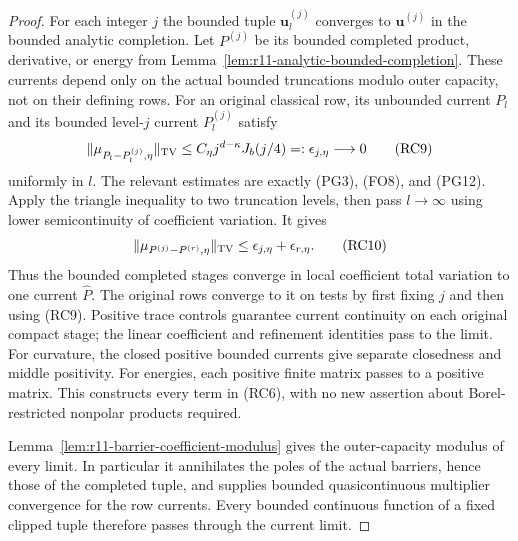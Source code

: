 \documentclass[11pt,a4paper]{article}
\numberwithin{equation}{section}
\theoremstyle{definition}
\theoremstyle{remark}
\begin{document}
\begin{proof}
For each integer $j$ the bounded tuple
$\mathbf u_l^{(j)}$ converges to $\mathbf u^{(j)}$ in the
bounded analytic completion. Let $P^{(j)}$ be its bounded
completed product, derivative, or energy from
Lemma~\ref{lem:r11-analytic-bounded-completion}.
These currents depend only on the actual bounded truncations
modulo outer capacity, not on their defining rows.
For an original classical row, its unbounded current $P_l$
and its bounded level-$j$ current $P_l^{(j)}$ satisfy
\[
    \|\mu_{P_l-P_l^{(j)},\eta}\|_{\rm TV}
               \leq C_\eta j^{d-\kappa}J_b(j/4)
                         =:\epsilon_{j,\eta}\longrightarrow0
 \tag{RC9}
\]
uniformly in $l$. The relevant estimates are exactly
(PG3), (FO8), and (PG12). Apply the triangle inequality
to two truncation levels, then pass $l\to\infty$ using
lower semicontinuity of coefficient variation. It gives
\[
       \|\mu_{P^{(j)}-P^{(r)},\eta}\|_{\rm TV}
                       \leq\epsilon_{j,\eta}+\epsilon_{r,\eta}.
 \tag{RC10}
\]
Thus the bounded completed stages converge in local coefficient
total variation to one current $\widehat P$. The original
rows converge to it on tests by first fixing $j$ and then
using (RC9). Positive trace controls guarantee current
continuity on each original compact stage; the linear
coefficient and refinement identities pass to the limit.
For curvature, the closed positive bounded currents give
separate closedness and middle positivity. For energies,
each positive finite matrix passes to a positive matrix.
This constructs every term in (RC6), with no new assertion
about Borel-restricted nonpolar products required.

Lemma~\ref{lem:r11-barrier-coefficient-modulus} gives the
outer-capacity modulus of every limit. In particular it
annihilates the poles of the actual barriers, hence those
of the completed tuple, and supplies bounded quasicontinuous
multiplier convergence for the row currents.
Every bounded continuous function of a fixed clipped tuple
therefore passes through the current limit.


\end{proof}
\end{document}
